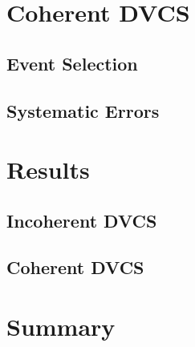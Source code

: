 \documentclass[aps,prc,preprint,superscriptaddress]{revtex4}
\begin{document}
\section{Coherent DVCS}

  \subsection{Event Selection}

  \subsection{Systematic Errors}

\section{Results}

  \subsection{Incoherent DVCS}

  \subsection{Coherent DVCS}

\section{Summary}


\end{document}
